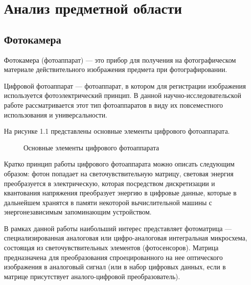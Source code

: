 \chapter{Анализ предметной области}
\label{cha:analysis}

\section{Фотокамера}

Фотокамера (фотоаппарат) --- это прибор для получения на фотографическом материале действительного изображения предмета при фотографировании.~\cite{gost}

Цифровой фотоаппарат --- фотоаппарат, в котором для регистрации изображения используется фотоэлектрический принцип. В данной научно-исследовательской работе рассматривается этот тип фотоаппаратов в виду их повсеместного использования и универсальности. 

На рисунке 1.1 представлены основные элементы цифрового фотоаппарата.

\begin{figure}[!h]
	\caption{Основные элементы цифрового фотоаппарата}
\end{figure}

Кратко принцип работы цифрового фотоаппарата можно описать следующим образом: фотон попадает на светочувствительную матрицу, световая энергия преобразуется в электрическую, которая посредством дискретизации и квантования напряжения преобразует энергию в цифровые данные, которые в дальнейшем хранятся в памяти некоторой вычислительной машины с энергонезависимым запоминающим устройством.

В рамках данной работы наибольший интерес представляет фотоматрица --- специализированная аналоговая или цифро-аналоговая интегральная микросхема, состоящая из светочувствительных элементов (фотосенсоров). Матрица предназначена для преобразования спроецированного на нее оптического изображения в аналоговый сигнал (или в набор цифровых данных, если в матрице присутствует аналого-цифровой преобразователь).

